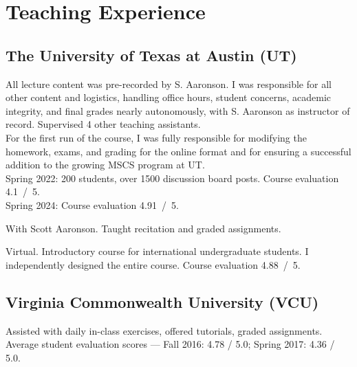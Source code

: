 \documentclass[11pt,letterpaper,serif]{moderncv}
\begin{document}
\section{Teaching Experience}
\subsection{The University of Texas at Austin (UT)}

{
	\begin{adjustwidth}{.25in}{}
		All lecture content was pre-recorded by S. Aaronson. I was responsible for all other content and logistics, handling office hours, student concerns, academic integrity, and final grades nearly autonomously, with S. Aaronson as instructor of record.
		Supervised 4 other teaching assistants.\\
		For the first run of the course,
		I was fully responsible for modifying the homework, exams, and grading for the online format and for ensuring a successful addition to the growing MSCS program at UT.\\
		Spring 2022: 200 students, over 1500 discussion board posts. Course evaluation 4.1~/~5.
		\\ Spring 2024: Course evaluation 4.91~/~5.
	\end{adjustwidth}
}


{
	\begin{adjustwidth}{.25in}{}
	With Scott Aaronson. Taught recitation and graded assignments.
	\end{adjustwidth}
}

{
	\begin{adjustwidth}{.25in}{}
		Virtual. Introductory course for international undergraduate students. I independently designed the entire course.
		Course evaluation 4.88~/~5.
	\end{adjustwidth}
}

\subsection{Virginia Commonwealth University (VCU)}
{
	\begin{adjustwidth}{.25in}{}
		Assisted with daily in-class exercises, offered tutorials, graded assignments. \newline
		Average student evaluation scores --- Fall 2016: 4.78 / 5.0; Spring 2017: 4.36 / 5.0.
	\end{adjustwidth}
}
\end{document}
